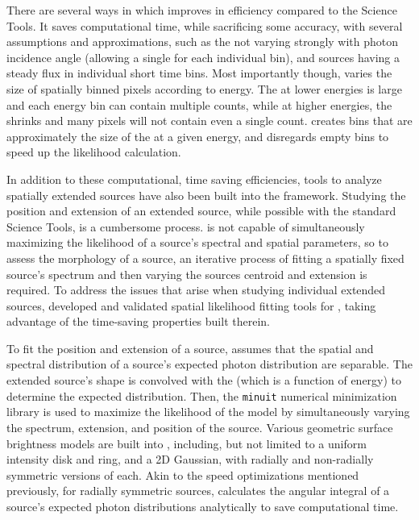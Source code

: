 There are several ways in which \ptlike{} improves in efficiency compared to the Science Tools. It saves computational time, while sacrificing some accuracy,
with several assumptions and approximations, such as the \psf{} not varying strongly with photon incidence angle (allowing a single \psf{} for each individual bin), and sources having a steady flux in individual short time bins. Most importantly though, \ptlike{} varies the size of spatially binned \heal{} pixels \citep{Gorski05} according to energy. The \psf{} at lower energies is large and each energy bin can contain multiple counts, while at higher energies, the \psf{} shrinks and many pixels will not contain even a single count. \ptlike{} creates \heal{} bins that are approximately the size of the \psf{} at a given energy, and disregards empty bins to speed up the likelihood calculation.

In addition to these computational, time saving efficiencies, tools to analyze spatially extended sources have also been built into the \ptlike{} framework. Studying the position and extension of an extended source, while possible with the standard \Fermi{} Science Tools, is a cumbersome process. \gtlike{} is not capable of simultaneously maximizing the likelihood of a source's spectral and spatial parameters, so to assess the morphology of a source, an iterative process of fitting a spatially fixed source's spectrum and then varying the sources centroid and extension is required. To address the issues that arise when studying individual extended sources, \cite{Lande12} developed and validated spatial likelihood fitting tools for \ptlike{}, taking advantage of the time-saving properties built therein.

To fit the position and extension of a source, \ptlike{} assumes that the spatial and spectral distribution of a source's expected photon distribution are separable. The extended source's shape is convolved with the \lat{} \psf{} (which is a function of energy) to determine the expected distribution. Then, the {\tt minuit} numerical minimization library\citep{James75} is used to maximize the likelihood of the model by simultaneously varying the spectrum, extension, and position of the source. Various geometric surface brightness models are built into \ptlike{}, including, but not limited to a uniform intensity disk and ring, and a 2D Gaussian, with radially and non-radially symmetric versions of each. Akin to the speed optimizations mentioned previously, for radially symmetric sources, \ptlike{} calculates the angular integral of a source's expected photon distributions analytically to save computational time.

